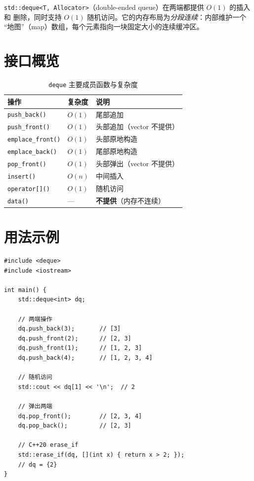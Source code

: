 \documentclass[12pt,a4paper,fontset=fandol]{ctexbook}
\newcommand{\Fn}[1]{\texttt{#1()}}
\newcommand{\Tp}[1]{\texttt{#1}}
\begin{document}
\Tp{std::deque<T, Allocator>}（double-ended queue）在两端都提供 $O(1)$ 的插入和
删除，同时支持 $O(1)$ 随机访问。它的内存布局为\emph{分段连续}：内部维护一个
``地图''（map）数组，每个元素指向一块固定大小的连续缓冲区。

\section{接口概览}

\begin{table}[htbp]
\centering
\caption{\Tp{deque} 主要成员函数与复杂度}
\begin{tabularx}{\textwidth}{l l X}
\toprule
\textbf{操作} & \textbf{复杂度} & \textbf{说明} \\
\midrule
\Fn{push\_back}       & $O(1)$ & 尾部追加 \\
\Fn{push\_front}      & $O(1)$ & 头部追加（vector 不提供） \\
\Fn{emplace\_front}   & $O(1)$ & 头部原地构造 \\
\Fn{emplace\_back}    & $O(1)$ & 尾部原地构造 \\
\Fn{pop\_front}       & $O(1)$ & 头部弹出（vector 不提供） \\
\Fn{insert}           & $O(n)$ & 中间插入 \\
\Fn{operator[]}       & $O(1)$ & 随机访问 \\
\Fn{data}             & ---    & \textbf{不提供}（内存不连续） \\
\bottomrule
\end{tabularx}
\end{table}

\section{用法示例}

\begin{lstlisting}
#include <deque>
#include <iostream>

int main() {
    std::deque<int> dq;

    // 两端操作
    dq.push_back(3);       // [3]
    dq.push_front(2);      // [2, 3]
    dq.push_front(1);      // [1, 2, 3]
    dq.push_back(4);       // [1, 2, 3, 4]

    // 随机访问
    std::cout << dq[1] << '\n';  // 2

    // 弹出两端
    dq.pop_front();        // [2, 3, 4]
    dq.pop_back();         // [2, 3]

    // C++20 erase_if
    std::erase_if(dq, [](int x) { return x > 2; });
    // dq = {2}
}
\end{lstlisting}
\end{document}
